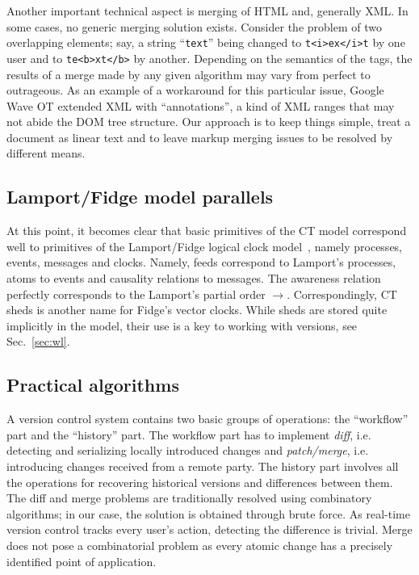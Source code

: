 \documentclass{acm_proc_article-sp}
\begin{document}
  Another important technical aspect is merging of HTML and, generally
  XML. In some cases, no generic merging solution exists. Consider the problem
   of two overlapping elements; say, a string ``\verb+text+'' being
  changed to \verb+t<i>ex</i>t+ by one user and to \verb+te<b>xt</b>+
  by another. Depending on the semantics of the tags,
  the results of a merge made by any given algorithm may vary from perfect
  to outrageous. As an example of a workaround for this particular
  issue, Google Wave OT extended XML with ``annotations'', a kind of XML
  ranges that may not abide the DOM tree  structure.
  Our approach is to keep things simple,
  treat a document as linear text and to leave markup
  merging issues to be resolved by different means.
  
   
\subsection {Lamport/Fidge model parallels}

At this point, it becomes clear that basic primitives of the CT model correspond well to primitives of the Lamport/Fidge logical clock model~\cite{lamport-clock,fidge-clock}, namely processes, events, messages and clocks. Namely, feeds correspond to Lamport's processes, atoms to events and causality relations to messages. The awareness relation perfectly corresponds to the Lamport's partial order $\to$. Correspondingly, CT sheds is another name for Fidge's vector clocks. While sheds are stored quite implicitly in the model, their use is a key to working with versions, see Sec.~\ref{sec:wl}.

\subsection {Practical algorithms}

A version control system contains two basic groups of operations: the ``workflow'' part and the ``history'' part. The workflow part has to implement \emph{diff}, i.e. detecting and serializing locally introduced changes and \emph{patch/merge}, i.e. introducing changes received from a remote party.
The history part involves all the operations for recovering historical versions and differences between them. The diff and merge problems are traditionally resolved using combinatory algorithms; in our case, the solution is obtained through brute force. As real-time version control tracks every user's action, detecting the difference is trivial. Merge does not pose a combinatorial problem as every atomic change has a precisely identified point of application.
\end{document}
